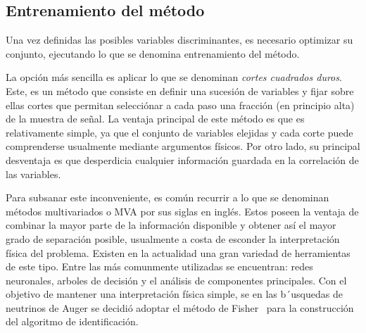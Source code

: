 	\subsection{Entrenamiento del método}
	
	Una vez definidas las posibles variables discriminantes, es necesario optimizar su conjunto, ejecutando lo que se denomina entrenamiento del método.
	
	La opción más sencilla es aplicar lo que se denominan \emph{cortes cuadrados duros}.
	Este, es un método que consiste en definir una sucesión de variables y fijar sobre ellas cortes que permitan selecciónar a cada paso una fracción (en principio alta) de la muestra de señal.
	La ventaja principal de este método es que es relativamente simple, ya que el conjunto de variables elejidas y cada corte puede comprenderse usualmente mediante argumentos físicos.
	Por otro lado, su principal desventaja es que desperdicia cualquier información guardada en la correlación de las variables.
	
	Para subsanar este inconveniente, es común recurrir a lo que se denominan métodos multivariados o MVA por sus siglas en inglés.
	Estos poseen la ventaja de combinar la mayor parte de la información disponible y obtener así el mayor grado de separación posible, usualmente a costa de esconder la interpretación física del problema.
	Existen en la actualidad una gran variedad de herramientas de este tipo. Entre las más comunmente utilizadas se encuentran: redes neuronales, arboles de decisión y el análisis de componentes principales. 
	Con el objetivo de mantener una interpretación física simple, se en las b´usquedas de neutrinos de Auger se decidió adoptar el método de Fisher~\cite{cite:Fisher} para la construcción del algoritmo de identificación.

